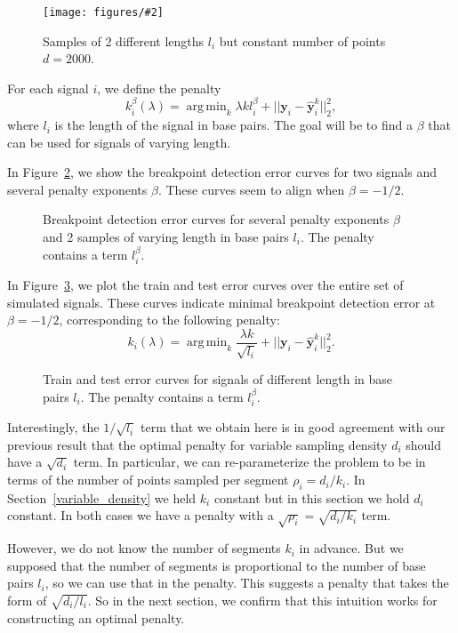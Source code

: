 \documentclass{jsfds} %
\newcommand{\fig}[3][H]{
  \begin{figure}[#1]
    \hskip -1cm
    
    \caption{#3}
    \label{fig:#2}
  \end{figure}
}
\newcommand{\figpdf}[3][H]{
  \begin{figure}[#1]
    \hskip -1cm
    \texttt{[image: figures/\#2]}
    \caption{#3}
    \label{fig:#2}
  \end{figure}
}
\DeclareMathOperator*{\argmin}{arg\,min}
\begin{document}
\figpdf{variable-breaks-constant-size}{Samples of 2 different lengths
  $l_i$ but constant number of points $d=2000$.}

\newpage

For each signal $i$, we define the penalty
\begin{equation}
  \label{eq:kstar_length}
  k_i^\beta(\lambda) = \argmin_k \lambda k l_i^\beta
+ ||\mathbf y_i - \mathbf{\hat y}_i^k||^2_2,
\end{equation}
where $l_i$ is the length of the signal in base pairs. The goal will
be to find a $\beta$ that can be used for signals of varying length.


In Figure~\ref{fig:variable-breaks-constant-size-berr}, we show
the breakpoint detection error curves for two signals and several
penalty exponents $\beta$.
These curves seem to align when $\beta=-1/2$.

\fig{variable-breaks-constant-size-berr}{Breakpoint detection error
  curves for several penalty exponents $\beta$ and 2 samples of
  varying length in base pairs $l_i$. The penalty contains a term
  $l_i^\beta$.}

\newpage

In Figure~\ref{fig:variable-breaks-constant-size-alpha}, we plot the
train and test error curves over the entire set of simulated signals.
These curves indicate minimal breakpoint detection error at
$\beta=-1/2$, corresponding to the following penalty:
\begin{equation}
  \label{eq:kstar_length_opt}
  k_i(\lambda) = \argmin_k \frac{\lambda k}{\sqrt{l_i}}
  + ||\mathbf y_i-\mathbf{\hat y}_i^k||^2_2.
\end{equation}




\fig{variable-breaks-constant-size-alpha}{Train and test error curves
  for signals of different length in base pairs $l_i$. The penalty
  contains a term
  $l_i^\beta$.}


Interestingly, the $1/\sqrt{l_i}$ term that we obtain here is in good
agreement with our previous result that the optimal penalty for
variable sampling density $d_i$ should have a $\sqrt{d_i}$ term. In
particular, we can re-parameterize the problem to be in terms of the
number of points sampled per segment $\rho_i=d_i/k_i$. In
Section~\ref{variable_density} we held $k_i$ constant but in this
section we hold $d_i$ constant. In both cases we have a penalty with a
$\sqrt{\rho_i}=\sqrt{d_i/k_i}$ term.

However, we do not know the number of segments $k_i$ in advance. But
we supposed that the number of segments is proportional to the number
of base pairs $l_i$, so we can use that in the penalty. This suggests
a penalty that takes the form of $\sqrt{d_i/l_i}$. So in the next
section, we confirm that this intuition works for constructing an
optimal penalty.
\end{document}
